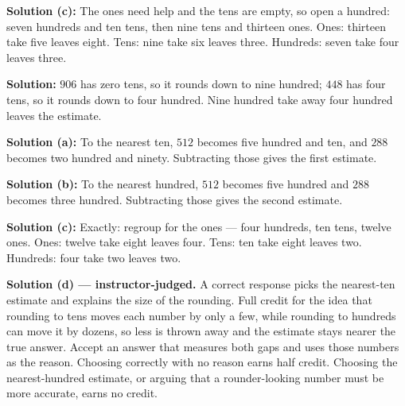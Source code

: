 \documentclass[12pt]{article}
\begin{document}
\textbf{Solution (c):} The ones need help and the tens are empty, so open a hundred: seven hundreds and ten tens, then nine tens and thirteen ones. Ones: thirteen take five leaves eight. Tens: nine take six leaves three. Hundreds: seven take four leaves three. 


\textbf{Solution:} $906$ has zero tens, so it rounds down to nine hundred; $448$ has four tens, so it rounds down to four hundred. Nine hundred take away four hundred leaves the estimate. 


\textbf{Solution (a):} To the nearest ten, $512$ becomes five hundred and ten, and $288$ becomes two hundred and ninety. Subtracting those gives the first estimate. 

\textbf{Solution (b):} To the nearest hundred, $512$ becomes five hundred and $288$ becomes three hundred. Subtracting those gives the second estimate. 

\textbf{Solution (c):} Exactly: regroup for the ones --- four hundreds, ten tens, twelve ones. Ones: twelve take eight leaves four. Tens: ten take eight leaves two. Hundreds: four take two leaves two. 

\textbf{Solution (d) --- instructor-judged.} A correct response picks the nearest-ten estimate and explains the size of the rounding. Full credit for the idea that rounding to tens moves each number by only a few, while rounding to hundreds can move it by dozens, so less is thrown away and the estimate stays nearer the true answer. Accept an answer that measures both gaps and uses those numbers as the reason. Choosing correctly with no reason earns half credit. Choosing the nearest-hundred estimate, or arguing that a rounder-looking number must be more accurate, earns no credit.
\end{document}
